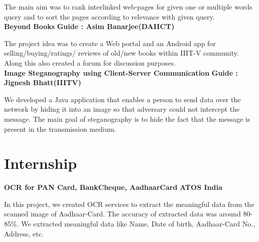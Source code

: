 \documentclass{article}
\begin{document}
\vspace*{.031mm}
\hspace*{2.6mm}The main aim was to rank interlinked web-pages for given one or multiple words query and to sort the pages according to relevance with given query.\\

\vspace*{2mm}
\textbf{\large{Beyond Books}} \hspace*{9.5cm} \textbf{Guide : Asim Banarjee(DAIICT)}

\vspace*{.031mm}
\hspace*{2.6mm} The project idea was to create a Web portal and an Android app for selling/buying/ratings/ reviews of old/new books within IIIT-V community. Along this also created a forum for discussion purposes.\\

\vspace*{2mm}
\textbf{\large{Image Steganography using Client-Server Communication}} \hspace*{1.5cm} \textbf{Guide : Jignesh Bhatt(IIITV)}

\vspace*{.031mm}
\hspace*{2.6mm} We developed a Java application that enables a person to send data over the network by hiding it into an image so that adversary could not intercept the message. The main goal of steganography is to hide the fact that the message is present in the transmission medium.


\newpage
\section{Internship}
\vspace*{2mm}
\textbf{\large{OCR for PAN Card, BankCheque, AadhaarCard}} \hspace*{6cm} \textbf{ATOS India}

\vspace*{.051mm}
\hspace*{2.6mm} In this project, we created OCR services to extract the meaningful data from the scanned image of Aadhaar-Card. The accuracy of extracted data was around 80-85\%. We extracted meaningful data like Name, Date of birth, Aadhaar-Card No., Address, etc.\\ %
\end{document}
